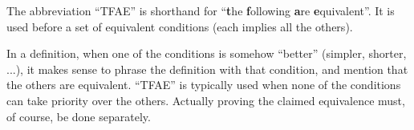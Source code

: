 \documentclass[12pt]{article}
\begin{document}
The abbreviation ``TFAE'' is shorthand for ``\textbf{t}he \textbf{f}ollowing \textbf{a}re \textbf{e}quivalent''.  It is used before a set of equivalent conditions (each implies all the others).

In a definition, when one of the conditions is somehow ``better'' (simpler, shorter, ...), it makes sense to phrase the definition with that condition, and mention that the others are equivalent.  ``TFAE'' is typically used when none of the conditions can take priority over the others.  Actually proving the claimed equivalence must, of course, be done separately.
\end{document}
